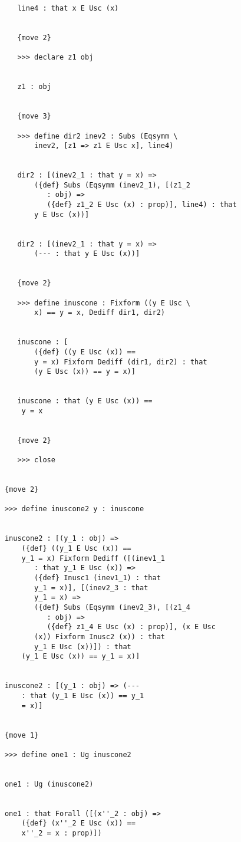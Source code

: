 \documentclass[12pt]{article}
\begin{document}
\begin{verbatim}
         line4 : that x E Usc (x)


         {move 2}

         >>> declare z1 obj


         z1 : obj


         {move 3}

         >>> define dir2 inev2 : Subs (Eqsymm \
             inev2, [z1 => z1 E Usc x], line4)


         dir2 : [(inev2_1 : that y = x) => 
             ({def} Subs (Eqsymm (inev2_1), [(z1_2 
                : obj) => 
                ({def} z1_2 E Usc (x) : prop)], line4) : that 
             y E Usc (x))]


         dir2 : [(inev2_1 : that y = x) => 
             (--- : that y E Usc (x))]


         {move 2}

         >>> define inuscone : Fixform ((y E Usc \
             x) == y = x, Dediff dir1, dir2)


         inuscone : [
             ({def} ((y E Usc (x)) == 
             y = x) Fixform Dediff (dir1, dir2) : that 
             (y E Usc (x)) == y = x)]


         inuscone : that (y E Usc (x)) == 
          y = x


         {move 2}

         >>> close


      {move 2}

      >>> define inuscone2 y : inuscone


      inuscone2 : [(y_1 : obj) => 
          ({def} ((y_1 E Usc (x)) == 
          y_1 = x) Fixform Dediff ([(inev1_1 
             : that y_1 E Usc (x)) => 
             ({def} Inusc1 (inev1_1) : that 
             y_1 = x)], [(inev2_3 : that 
             y_1 = x) => 
             ({def} Subs (Eqsymm (inev2_3), [(z1_4 
                : obj) => 
                ({def} z1_4 E Usc (x) : prop)], (x E Usc 
             (x)) Fixform Inusc2 (x)) : that 
             y_1 E Usc (x))]) : that 
          (y_1 E Usc (x)) == y_1 = x)]


      inuscone2 : [(y_1 : obj) => (--- 
          : that (y_1 E Usc (x)) == y_1 
          = x)]


      {move 1}

      >>> define one1 : Ug inuscone2


      one1 : Ug (inuscone2)


      one1 : that Forall ([(x''_2 : obj) => 
          ({def} (x''_2 E Usc (x)) == 
          x''_2 = x : prop)])



\end{verbatim}
\end{document}
